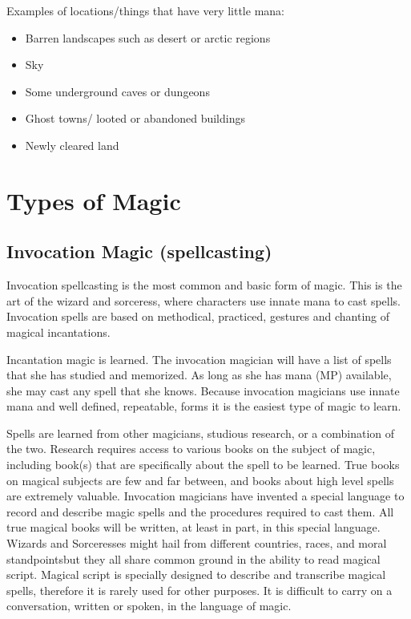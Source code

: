 \documentclass[twoside]{book}
\begin{document}
    {  
    Examples of locations/things that have very little mana:
    }
  
\begin{itemize}
      
  \item Barren landscapes such as desert or arctic regions
  \item Sky
  \item Some underground caves or dungeons
  \item Ghost towns/ looted or abandoned buildings
  \item Newly cleared land
\end{itemize}
  
    

\section{Types of Magic}
    
    

\subsection{Invocation Magic (spellcasting)}
    
    {  
    Invocation spellcasting is the most common and basic form of magic. This is the art of the wizard and sorceress, where characters use innate mana to cast spells. Invocation spells are based on methodical, practiced, gestures and chanting of magical incantations.
    }
  
    {  
    Incantation magic is learned. The invocation magician will have a list of spells that she has studied and memorized. As long as she has mana (MP) available, she may cast any spell that she knows. Because invocation magicians use innate mana and well defined, repeatable, forms it is the easiest type of magic to learn.
    }
  
    {  
    Spells are learned from other magicians, studious research, or a combination of the two. Research requires access to various books on the subject of magic, including book(s) that are specifically about the spell to be learned. True books on magical subjects are few and far between, and books about high level spells are extremely valuable. Invocation magicians have invented a special language to record and describe magic spells and the procedures required to cast them. All true magical books will be written, at least in part, in this special language. Wizards and Sorceresses might hail from different countries, races, and moral standpointsbut they all share common ground in the ability to read magical script. Magical script is specially designed to describe and transcribe magical spells, therefore it is rarely used for other purposes. It is difficult to carry on a conversation, written or spoken, in the language of magic.
    }
  
\end{document}
